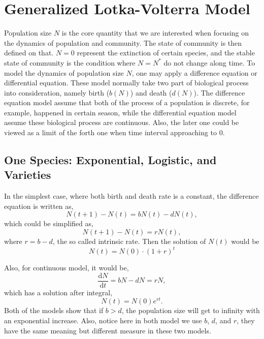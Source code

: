 \section{Generalized Lotka-Volterra Model}

    Population size $N$ is the core quantity that we are interested when focusing on the dynamics of population and community. The state of community is then defined on that. $N=0$ represent the extinction of certain species, and the stable state of community is the condition where $N=N^*$ do not change along time. To model the dynamics of population size $N$, one may apply a difference equation or differential equation. These model normally take two part of biological process into consideration, namely birth ($b(N)$) and death ($d(N)$). The difference equation model assume that both of the process of a population is discrete, for example, happened in certain season, while the differential equation model assume these biological process are continuous. Also, the later one could be viewed as a limit of the forth one when time interval approaching to $0$.

    \subsection{One Species: Exponential, Logistic, and Varieties}

    In the simplest case, where both birth and death rate is a constant, the difference equation is written as,
    \begin{equation*}
        N(t+1) - N(t) = bN(t) - dN(t),
    \end{equation*}
    which could be simplified as,
    \begin{equation}\label{A:eqn:discrete_exponential}
        N(t+1) - N(t) = rN(t),
    \end{equation}
    where $r = b-d$, the so called intrinsic rate. Then the solution of $N(t)$ would be 
    \begin{equation*}
        N(t) = N(0) \cdot (1+r)^{t}
    \end{equation*}

    Also, for continuous model, it would be,
    \begin{equation}\label{A:eqn:continuous_exponential}
        \frac{\mathrm{d} N}{\mathrm{d}t} = bN-dN = rN,
    \end{equation}
    which has a solution after integral,
    \begin{equation*}
        N(t) = N(0) e^{rt}.
    \end{equation*}
    Both of the models show that if $b>d$, the population size will get to infinity with an exponential increase. Also, notice here in both model we use $b$, $d$, and $r$, they have the same meaning but different measure in these two models.

